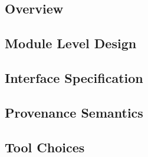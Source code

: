 \documentclass[10pt]{article}
\begin{document}
\subsection{Overview}


\subsection{Module Level Design}


\subsection{Interface Specification}


\subsection{Provenance Semantics}


\subsection{Tool Choices}

\end{document}
